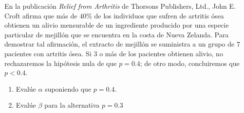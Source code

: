 \begin{enunciado}
 En la publicaci\'on \textit{Relief from Arthritis} de Thorsons Publishers, Ltd., John E. Croft afirma que m\'as de $40\%$ de los individuos que sufren de artritis \'osea obtienen un alivio mensurable de un ingrediente producido por una especie particular de mejill\'on que se encuentra en la costa de Nueva Zelanda. Para demostrar tal afirmaci\'on, el extracto de mejill\'on se suministra a un grupo de $7$ pacientes con artritis \'osea. Si $3$ o m\'as de los pacientes obtienen alivio, no rechazaremos la hip\'otesis nula de que $p = 0.4$; de otro modo, concluiremos que $p < 0.4$.
 \begin{enumerate}
  \item Eval\'ue $\alpha$ suponiendo que $p = 0.4$. 
  
  \item Eval\'ue $\beta$ para la alternativa $p = 0.3$
 \end{enumerate}
\end{enunciado}

